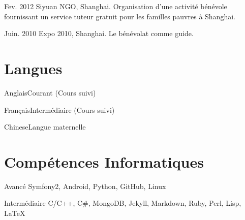 \documentclass{tccv}
\begin{document}
\begin{factlist}
\item{Fev. 2012}
{Siyuan NGO, Shanghai. Organisation d’une activité bénévole fournissant un service tuteur gratuit pour les familles pauvres à Shanghai.}
\item{Juin. 2010}
{Expo 2010, Shanghai. Le bénévolat comme guide.}
\end{factlist}

\section{Langues}

\begin{factlist}
\item{Anglais}{Courant (Cours suivi)}
\item{Français}{Intermédiaire (Cours suivi)}
\item{Chinese}{Langue maternelle}
\end{factlist}

\section{Compétences Informatiques}

\begin{factlist}

\item{Avancé}
     {Symfony2, Android, Python, GitHub, Linux}

\item{Intermédiaire}
     {C/C++, C\#, MongoDB, Jekyll, Markdown, Ruby, Perl, Lisp, LaTeX}

\end{factlist}
\end{document}
